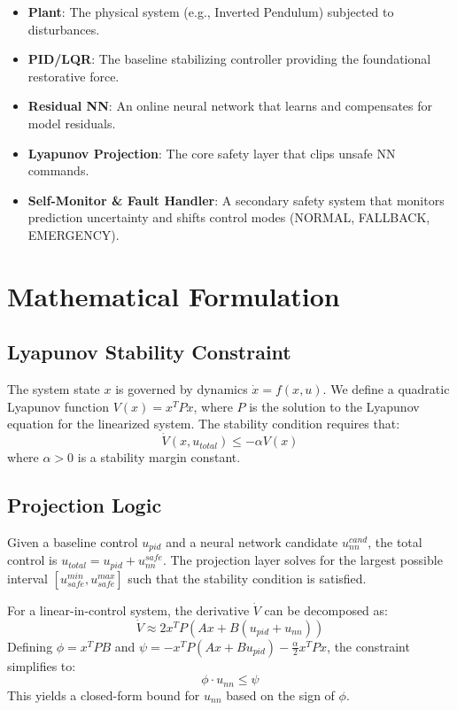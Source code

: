\documentclass[11pt,a4paper]{article}
\newcommand{\xdot}{\dot{x}}
\newcommand{\Vdot}{\dot{V}}
\begin{document}
\begin{itemize}
    \item \textbf{Plant}: The physical system (e.g., Inverted Pendulum) subjected to disturbances.
    \item \textbf{PID/LQR}: The baseline stabilizing controller providing the foundational restorative force.
    \item \textbf{Residual NN}: An online neural network that learns and compensates for model residuals.
    \item \textbf{Lyapunov Projection}: The core safety layer that clips unsafe NN commands.
    \item \textbf{Self-Monitor \& Fault Handler}: A secondary safety system that monitors prediction uncertainty and shifts control modes (NORMAL, FALLBACK, EMERGENCY).
\end{itemize}

\section{Mathematical Formulation}

\subsection{Lyapunov Stability Constraint}
The system state $x$ is governed by dynamics $\xdot = f(x, u)$. We define a quadratic Lyapunov function $V(x) = x^T P x$, where $P$ is the solution to the Lyapunov equation for the linearized system. The stability condition requires that:
\begin{equation}
    \Vdot(x, u_{total}) \leq -\alpha V(x)
\end{equation}
where $\alpha > 0$ is a stability margin constant.

\subsection{Projection Logic}
Given a baseline control $u_{pid}$ and a neural network candidate $u_{nn}^{cand}$, the total control is $u_{total} = u_{pid} + u_{nn}^{safe}$. The projection layer solves for the largest possible interval $[u_{safe}^{min}, u_{safe}^{max}]$ such that the stability condition is satisfied.

For a linear-in-control system, the derivative $\Vdot$ can be decomposed as:
\begin{equation}
    \Vdot \approx 2x^T P (Ax + B(u_{pid} + u_{nn}))
\end{equation}
Defining $\phi = x^T P B$ and $\psi = -x^T P (Ax + Bu_{pid}) - \frac{\alpha}{2} x^T P x$, the constraint simplifies to:
\begin{equation}
    \phi \cdot u_{nn} \leq \psi
\end{equation}
This yields a closed-form bound for $u_{nn}$ based on the sign of $\phi$.
\end{document}

